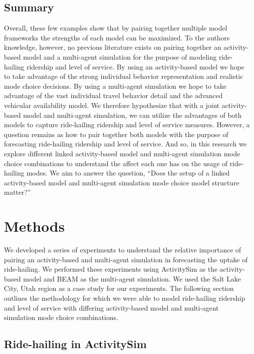 \documentclass[fancy, masters]{byuthesis}
\begin{document}
\hypertarget{summary}{%
\section{Summary}\label{summary}}

Overall, these few examples show that by pairing together multiple model frameworks the strengths of each model can be maximized. To the authors knowledge, however, no previous literature exists on pairing together an activity-based model and a multi-agent simulation for the purpose of modeling ride-hailing ridership and level of service. By using an activity-based model we hope to take advantage of the strong individual behavior representation and realistic mode choice decisions. By using a multi-agent simulation we hope to take advantage of the vast individual travel behavior detail and the advanced vehicular availability model. We therefore hypothesize that with a joint activity-based model and multi-agent simulation, we can utilize the advantages of both models to capture ride-hailing ridership and level of service measures. However, a question remains as how to pair together both models with the purpose of forecasting ride-hailing ridership and level of service. And so, in this research we explore different linked activity-based model and multi-agent simulation mode choice combinations to understand the affect each one has on the usage of ride-hailing modes. We aim to answer the question, ``Does the setup of a linked activity-based model and multi-agent simulation mode choice model structure matter?''

\hypertarget{meth}{%
\chapter{Methods}\label{meth}}

We developed a series of experiments to understand the relative importance of pairing an activity-based and multi-agent simulation in forecasting the uptake of ride-hailing. We performed these experiments using ActivitySim as the activity-based model and BEAM as the multi-agent simulation. We used the Salt Lake City, Utah region as a case study for our experiments. The following section outlines the methodology for which we were able to model ride-hailing ridership and level of service with differing activity-based model and multi-agent simulation mode choice combinations.

\hypertarget{ride-hailing-in-activitysim}{%
\section{Ride-hailing in ActivitySim}\label{ride-hailing-in-activitysim}}
\end{document}
